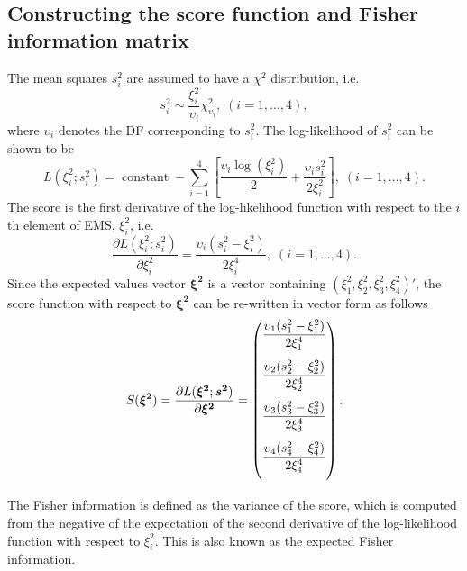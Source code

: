 \subsection{Constructing the score function and Fisher information matrix} 
The mean squares $s_i^2$ are assumed to have a $\chi^2$ distribution, i.e.\
\begin{equation}\label{eq:chiDistr}
s_i^2 \sim \dfrac{\xi_i^2}{\upsilon_i} \chi_{\upsilon_i}^2, \;  (i = 1,\dots,4), 
\end{equation}
where $\upsilon_i$ denotes the DF corresponding to $s_i^2$. The log-likelihood of $s_i^2$ can be shown to be 
\begin{equation}\label{eq:logLike}
L(\xi_i^2;s_i^2) =  \operatorname{constant} - \sum_{i = 1}^{4}\left[ \dfrac{\upsilon_i  \log(\xi_i^2)}{2} + \dfrac{\upsilon_i s_i^2}{2\xi_i^2}\right], \;  (i = 1,\dots,4).
\end{equation}  
The score is the first derivative of the log-likelihood function with respect to the $i$th element of EMS, $\xi_i^2$, i.e.\
\[\dfrac{\partial L(\xi_i^2;s_i^2)}{\partial \xi_i^2} = \dfrac{\upsilon_i (s_i^2 - \xi_i^2)}{2\xi_i^4}, \;  (i = 1,\dots,4).\]
Since the expected values vector $\bm{\xi^2}$ is a vector containing $(\xi_1^2, \xi_2^2,\xi_3^2,\xi_4^2)'$, the score function with respect to $\bm{\xi^2}$ can be re-written in vector form as follows
\begin{equation}\label{eq:scoreFunOld}
S(\bm{\xi^2}) = \dfrac{\partial L(\bm{\xi^2};\bm{s^2})}{\partial \bm{\xi^2}} = 
\begin{pmatrix}               
\vspace{8pt}\dfrac{\upsilon_1 (s_1^2 - \xi_1^2)}{2\xi_1^4} \\
\vspace{8pt} \dfrac{\upsilon_2 (s_2^2 - \xi_2^2)}{2\xi_2^4} \\
\vspace{8pt} \dfrac{\upsilon_3 (s_3^2 - \xi_3^2)}{2\xi_3^4}  \\
\vspace{8pt} \dfrac{\upsilon_4 (s_4^2 - \xi_4^2)}{2\xi_4^4}  \\
\end{pmatrix}.
\end{equation}

The Fisher information is defined as the variance of the score, which is computed from the negative of the expectation of the second derivative of the log-likelihood function with respect to $\xi_i^2$. This is also known as the expected Fisher information.

